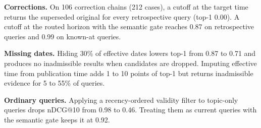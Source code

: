 \documentclass[11pt]{article}
\begin{document}
\textbf{Corrections.} On 106 correction chains (212 cases), a cutoff at the target time returns the superseded original for every retrospective query (top-1 0.00). A cutoff at the routed horizon with the semantic gate reaches 0.87 on retrospective queries and 0.99 on known-at queries.

\textbf{Missing dates.} Hiding 30\% of effective dates lowers top-1 from 0.87 to 0.71 and produces no inadmissible results when candidates are dropped. Imputing effective time from publication time adds 1 to 10 points of top-1 but returns inadmissible evidence for 5 to 55\% of queries.

\textbf{Ordinary queries.} Applying a recency-ordered validity filter to topic-only queries drops nDCG@10 from 0.98 to 0.46. Treating them as current queries with the semantic gate keeps it at 0.92.
\end{document}
